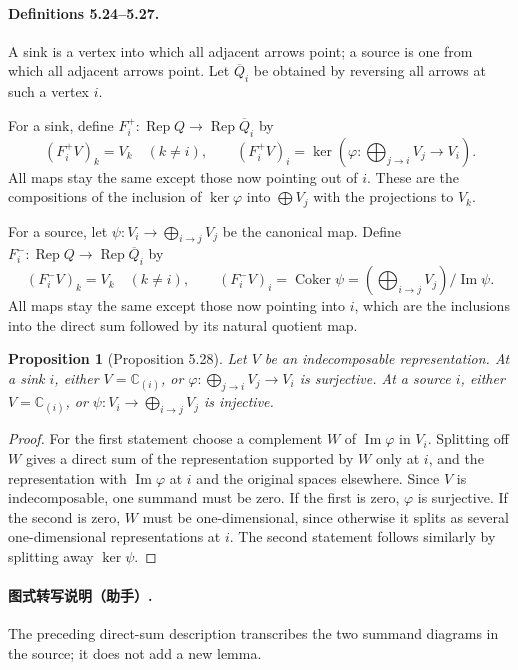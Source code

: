 \documentclass[UTF8,11pt,a4paper]{ctexart}
\newtheorem*{proposition}{Proposition}
\theoremstyle{definition}\newtheorem*{definition}{Definition}
\theoremstyle{remark}\newtheorem*{remark}{Remark}
\DeclareMathOperator{\im}{Im}
\newcommand{\C}{\mathbb C}
\begin{document}
\paragraph{Definitions 5.24--5.27.}
A sink is a vertex into which all adjacent arrows point; a source is one from which all adjacent arrows point. Let $\overline Q_i$ be obtained by reversing all arrows at such a vertex $i$.

For a sink, define $F_i^+:\operatorname{Rep}Q\to\operatorname{Rep}\overline Q_i$ by
\[
(F_i^+V)_k=V_k\quad(k\ne i),\qquad
(F_i^+V)_i=\ker\left(\varphi:\bigoplus_{j\to i}V_j\longrightarrow V_i\right).
\]
All maps stay the same except those now pointing out of $i$. These are the compositions of the inclusion of $\ker\varphi$ into $\bigoplus V_j$ with the projections to $V_k$.

For a source, let $\psi:V_i\to\bigoplus_{i\to j}V_j$ be the canonical map. Define $F_i^-:\operatorname{Rep}Q\to\operatorname{Rep}\overline Q_i$ by
\[
(F_i^-V)_k=V_k\quad(k\ne i),\qquad
(F_i^-V)_i=\operatorname{Coker}\psi=\left(\bigoplus_{i\to j}V_j\right)/\im\psi.
\]
All maps stay the same except those now pointing into $i$, which are the inclusions into the direct sum followed by its natural quotient map.

\begin{proposition}[Proposition 5.28]
Let $V$ be an indecomposable representation. At a sink $i$, either $V=\C_{(i)}$, or $\varphi:\bigoplus_{j\to i}V_j\to V_i$ is surjective. At a source $i$, either $V=\C_{(i)}$, or $\psi:V_i\to\bigoplus_{i\to j}V_j$ is injective.
\end{proposition}
\begin{proof}
For the first statement choose a complement $W$ of $\im\varphi$ in $V_i$. Splitting off $W$ gives a direct sum of the representation supported by $W$ only at $i$, and the representation with $\im\varphi$ at $i$ and the original spaces elsewhere. Since $V$ is indecomposable, one summand must be zero. If the first is zero, $\varphi$ is surjective. If the second is zero, $W$ must be one-dimensional, since otherwise it splits as several one-dimensional representations at $i$. The second statement follows similarly by splitting away $\ker\psi$.
\end{proof}
\paragraph{图式转写说明（助手）.} The preceding direct-sum description transcribes the two summand diagrams in the source; it does not add a new lemma.
\end{document}
